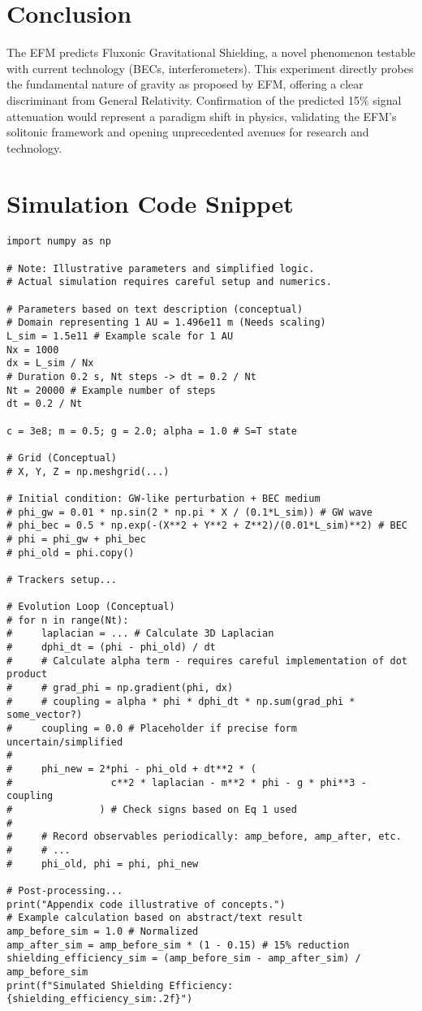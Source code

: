 \documentclass[11pt]{article}
\begin{document}
\section{Conclusion}
The EFM predicts Fluxonic Gravitational Shielding, a novel phenomenon testable with current technology (BECs, interferometers). This experiment directly probes the fundamental nature of gravity as proposed by EFM, offering a clear discriminant from General Relativity. Confirmation of the predicted 15\% signal attenuation would represent a paradigm shift in physics, validating the EFM's solitonic framework and opening unprecedented avenues for research and technology.

\appendix
\section{Simulation Code Snippet}
\begin{lstlisting}
import numpy as np

# Note: Illustrative parameters and simplified logic.
# Actual simulation requires careful setup and numerics.

# Parameters based on text description (conceptual)
# Domain representing 1 AU = 1.496e11 m (Needs scaling)
L_sim = 1.5e11 # Example scale for 1 AU
Nx = 1000
dx = L_sim / Nx
# Duration 0.2 s, Nt steps -> dt = 0.2 / Nt
Nt = 20000 # Example number of steps
dt = 0.2 / Nt

c = 3e8; m = 0.5; g = 2.0; alpha = 1.0 # S=T state

# Grid (Conceptual)
# X, Y, Z = np.meshgrid(...)

# Initial condition: GW-like perturbation + BEC medium
# phi_gw = 0.01 * np.sin(2 * np.pi * X / (0.1*L_sim)) # GW wave
# phi_bec = 0.5 * np.exp(-(X**2 + Y**2 + Z**2)/(0.01*L_sim)**2) # BEC
# phi = phi_gw + phi_bec
# phi_old = phi.copy()

# Trackers setup...

# Evolution Loop (Conceptual)
# for n in range(Nt):
#     laplacian = ... # Calculate 3D Laplacian
#     dphi_dt = (phi - phi_old) / dt
#     # Calculate alpha term - requires careful implementation of dot product
#     # grad_phi = np.gradient(phi, dx)
#     # coupling = alpha * phi * dphi_dt * np.sum(grad_phi * some_vector?)
#     coupling = 0.0 # Placeholder if precise form uncertain/simplified
#
#     phi_new = 2*phi - phi_old + dt**2 * (
#                 c**2 * laplacian - m**2 * phi - g * phi**3 - coupling
#               ) # Check signs based on Eq 1 used
#
#     # Record observables periodically: amp_before, amp_after, etc.
#     # ...
#     phi_old, phi = phi, phi_new

# Post-processing...
print("Appendix code illustrative of concepts.")
# Example calculation based on abstract/text result
amp_before_sim = 1.0 # Normalized
amp_after_sim = amp_before_sim * (1 - 0.15) # 15% reduction
shielding_efficiency_sim = (amp_before_sim - amp_after_sim) / amp_before_sim
print(f"Simulated Shielding Efficiency: {shielding_efficiency_sim:.2f}")

\end{lstlisting}
\end{document}
